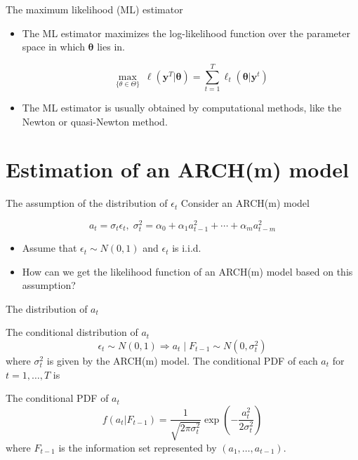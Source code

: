 \documentclass[presentation,10pt]{beamer}
\begin{document}
\begin{frame}[label={sec:org45916b1}]{The maximum likelihood (ML) estimator}
\begin{itemize}
\item The ML estimator maximizes the log-likelihood function over the
parameter space in which \(\boldsymbol{\theta}\) lies in.

\begin{equation}
\operatorname*{max}_{\{\theta \in \Theta\}}\: \ell(\mathbf{y}^T | \boldsymbol{\theta}) = \sum_{t=1}^T \ell_t(\boldsymbol{\theta} | \mathbf{y}^t)
\end{equation}

\item The ML estimator is usually obtained by computational methods, like
the Newton or quasi-Newton method.
\end{itemize}
\end{frame}

\section{Estimation of an ARCH(m) model}
\label{sec:orgf7cb5f6}

\begin{frame}[label={sec:org6a4ce4c}]{The assumption of the distribution of \(\epsilon_t\)}
Consider an ARCH(m) model

\begin{equation*}
a_t = \sigma_t \epsilon_t,\; \sigma^2_t = \alpha_0 + \alpha_1 a^2_{t-1} + \cdots + \alpha_m a^2_{t-m}
\end{equation*}

\begin{itemize}
\item Assume that \(\epsilon_t \sim N(0, 1)\) and \(\epsilon_t\) is i.i.d.

\item How can we get the likelihood function of an ARCH(m) model based on
this assumption?
\end{itemize}
\end{frame}

\begin{frame}[label={sec:org3c4068e}]{The distribution of \(a_t\)}
\begin{block}{The conditional distribution of \(a_t\)}
\[ \epsilon_t \sim N(0, 1) \Rightarrow a_t \mid F_{t-1} \sim N(0,
\sigma^2_t) \] 
where \(\sigma^2_t\) is given by the ARCH(m) model. The
conditional PDF of each \(a_t\) for \(t=1, \ldots, T\) is
\end{block}

\begin{block}{The conditional PDF of \(a_t\)}
\[
f(a_t | F_{t-1}) = \frac{1}{\sqrt{2 \pi \sigma^2_t}} \exp
\left(-\frac{a^2_t}{2\sigma^2_t}\right)
\] 
where \(F_{t-1}\) is the information set represented by \((a_1, \ldots,
a_{t-1})\).
\end{block}
\end{frame}
\end{document}
